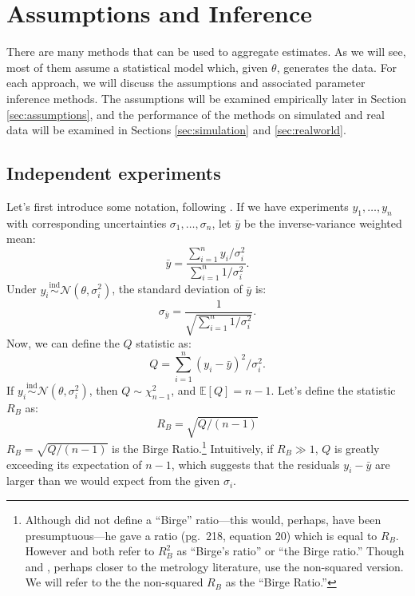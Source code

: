 \documentclass[letterpaper,12pt]{article}
\begin{document}
\section{Assumptions and Inference}\label{sec:methods}

There are many methods that can be used to aggregate estimates. As we will see, most of them assume a statistical model which, given $\theta$, generates the data. For each approach, we will discuss the assumptions and associated parameter inference methods. The assumptions will be examined empirically later in Section \ref{sec:assumptions}, and the performance of the methods on simulated and real data will be examined in Sections \ref{sec:simulation} and \ref{sec:realworld}.

\subsection{Independent experiments}

Let's first introduce some notation, following \citet{baker2013meta}. If we have experiments $y_1,\ldots,y_n$ with corresponding uncertainties $\sigma_1,\ldots,\sigma_n$, let $\bar{y}$ be the inverse-variance weighted mean:
\begin{equation}\label{eq:ybar}
  \bar{y}=\frac{\sum_{i=1}^n y_i/\sigma_i^2}{\sum_{i=1}^n 1/\sigma_i^2}.
\end{equation}
Under $y_i\overset{\mathrm{ind}}\sim\mathcal{N}(\theta,\sigma_i^2)$, the standard deviation of $\bar{y}$ is:
\begin{equation}\label{eq:sigmaybar}
  \sigma_{\bar y}=\frac{1}{\sqrt{\sum_{i=1}^n1/\sigma_i^2}}.
\end{equation}
Now, we can define the $Q$ statistic as:
\begin{equation}\label{eq:Q}
  Q=\sum_{i=1}^n (y_i-\bar{y})^2/\sigma_i^2.
\end{equation}
If $y_i\overset{\mathrm{ind}}\sim\mathcal{N}(\theta,\sigma_i^2)$, then $Q\sim\chi^2_{n-1}$, and $\mathbb E[Q]=n-1$. Let's define the statistic $R_B$ as:
\[R_B=\sqrt{Q/(n-1)}\]
$R_B=\sqrt{Q/(n-1)}$ is the Birge Ratio.\footnote{Although \citet{birge1932calculation} did not define a ``Birge'' ratio---this would, perhaps, have been presumptuous---he gave a ratio (pg.~218, equation 20) which is equal to $R_B$. However \citet{baker2013meta} and \citet{hedges1987hard} both refer to $R_B^2$ as ``Birge's ratio'' or ``the Birge ratio.'' Though \citet[Section 3.1]{kacker2002combined} and \citet[Section III.A.1]{taylor1969determination}, perhaps closer to the metrology literature, use the non-squared version. We will refer to the the non-squared $R_B$ as the ``Birge Ratio.''} Intuitively, if $R_B\gg1$, $Q$ is greatly exceeding its expectation of $n-1$, which suggests that the residuals $y_i-\bar{y}$ are larger than we would expect from the given $\sigma_i$.
\end{document}
